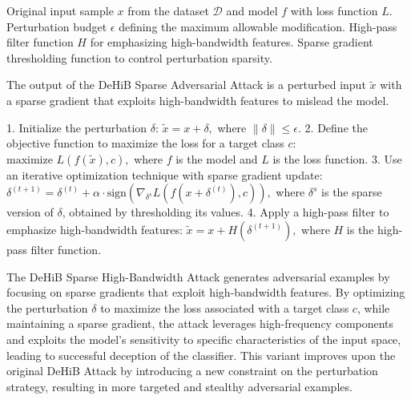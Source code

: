 Original input sample $x$ from the dataset $\mathcal{D}$ and model $f$ with loss function $L$. 
Perturbation budget $\epsilon$ defining the maximum allowable modification.
High-pass filter function $H$ for emphasizing high-bandwidth features.
Sparse gradient thresholding function to control perturbation sparsity.


The output of the DeHiB Sparse Adversarial Attack is a perturbed input $\tilde{x}$ with a sparse gradient that exploits high-bandwidth features to mislead the model.

1. Initialize the perturbation $\delta$:
   $
   \tilde{x} = x + \delta,
   $
   where $\|\delta\| \leq \epsilon.$
2. Define the objective function to maximize the loss for a target class $c$:
   $
   \text{maximize } L(f(\tilde{x}), c),
   $
   where $f$ is the model and $L$ is the loss function.
3. Use an iterative optimization technique with sparse gradient update:
   $
   \delta^{(t+1)} = \delta^{(t)} + \alpha \cdot \text{sign}(\nabla_{\delta^s} L(f(x + \delta^{(t)}), c)),
   $
   where $\delta^s$ is the sparse version of $\delta$, obtained by thresholding its values.
4. Apply a high-pass filter to emphasize high-bandwidth features:
   $
   \tilde{x} = x + H(\delta^{(t+1)}),
   $
   where $H$ is the high-pass filter function.

The DeHiB Sparse High-Bandwidth Attack generates adversarial examples by focusing on sparse gradients that exploit high-bandwidth features. By optimizing the perturbation $\delta$ to maximize the loss associated with a target class $c$, while maintaining a sparse gradient, the attack leverages high-frequency components and exploits the model's sensitivity to specific characteristics of the input space, leading to successful deception of the classifier. This variant improves upon the original DeHiB Attack by introducing a new constraint on the perturbation strategy, resulting in more targeted and stealthy adversarial examples.